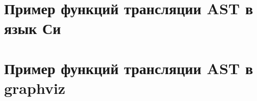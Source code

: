 \section*{Пример функций трансляции AST в язык Си}


\section*{Пример функций трансляции AST в graphviz}




% 








